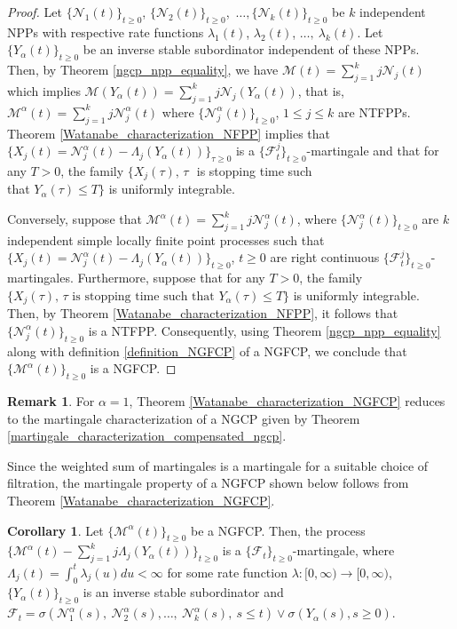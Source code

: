 \documentclass[11pt,oneside,reqno]{amsart}
\theoremstyle{definition}
\newtheorem{remark}{\bf Remark}[section]
\newtheorem{corollary}{Corollary}[section]
\theoremstyle{remarkstyle}
\def\t{\tau}
\begin{document}
\begin{proof}
    Let $\{\mathcal{N}_1(t)\}_{t\ge 0}$, $\{\mathcal{N}_2(t)\}_{t\ge 0}$,~$\dots,\{\mathcal{N}_k(t)\}_{t\ge 0}$ be $k$ independent NPPs with respective rate functions $\lambda_1(t)$, $\lambda_2(t)$, $\dots,~\lambda_k(t)$. Let $\{Y_\alpha(t)\}_{t\ge 0}$ be an inverse stable subordinator independent of these NPPs. Then, by Theorem \ref{ngcp_npp_equality}, we have $\mathcal{M}(t)=\sum_{j=1}^{k}j\mathcal{N}_j(t)$ which implies $\mathcal{M}(Y_\alpha(t))=\sum_{j=1}^{k}j\mathcal{N}_j(Y_\alpha(t))$, that is, $\mathcal{M}^\alpha(t)=\sum_{j=1}^{k}j\mathcal{N}_j^\alpha(t)$ where $\{\mathcal{N}_j^\alpha(t)\}_{t\ge 0}$, $1\le j\le k$ are NTFPPs. Theorem \ref{Watanabe_characterization_NFPP} implies that $\{X_j(t)=\mathcal{N}_j^\alpha(t)-\Lambda_j(Y_\alpha(t))\}_{\t\ge 0}$ is a $\{\mathcal{F}_t^j\}_{t\ge 0}$-martingale and that for any $T>0$, the family $\{X_j(\tau),\,\tau\,\,$ is stopping time such\\ that$\,\,Y_{\alpha}(\tau)\le T\}$ is uniformly integrable. 
    
    Conversely, suppose that $\mathcal{M}^\alpha(t)=\sum_{j=1}^{k}j\mathcal{N}_j^\alpha(t)$, where $\{\mathcal{N}_j^\alpha(t)\}_{t\ge 0}$ are $k$ independent simple locally finite point processes such that $\{X_j(t)=\mathcal{N}_j^\alpha(t)-\Lambda_j(Y_\alpha(t))\}_{t\ge 0}$, $t\ge 0$ are right continuous $\{\mathcal{F}_t^j\}_{t\ge 0}$-martingales. Furthermore, suppose that for any $T>0$, the family $\{X_j(\tau),\,\tau\,\, \text{is stopping time such that}\,\,Y_{\alpha}(\tau)\le T\}$ is uniformly integrable. Then, by Theorem \ref{Watanabe_characterization_NFPP}, it follows that $\{\mathcal{N}_j^\alpha(t)\}_{t\ge 0}$ is a NTFPP. Consequently, using Theorem \ref{ngcp_npp_equality} along with definition \eqref{definition_NGFCP} of a NGFCP, we conclude that $\{\mathcal{M}^\alpha(t)\}_{t\ge 0}$ is a NGFCP.
\end{proof}
\begin{remark}
    For $\alpha=1$, Theorem \ref{Watanabe_characterization_NGFCP} reduces to the martingale characterization of a NGCP given by Theorem \ref{martingale_characterization_compensated_ngcp}.
\end{remark}
Since the weighted sum of martingales is a martingale for a suitable choice of filtration, the martingale property of a NGFCP shown below follows from Theorem \ref{Watanabe_characterization_NGFCP}.
\begin{corollary}\label{martingale_corollary_NGFCP}
    Let $\{\mathcal{M}^\alpha(t)\}_{t\ge 0}$ be a NGFCP. Then, the process $\{\mathcal{M}^\alpha(t)-\sum_{j=1}^{k}j\Lambda_j\left(Y_{\alpha}(t)\right)\}_{t\ge 0}$ is a $\{\mathcal{F}_t\}_{t\ge 0}$-martingale, where $\Lambda_j(t)=\int_{0}^{t}\lambda_j(u)du<\infty$ for some rate function $\lambda:[0,\infty)\to[0,\infty)$, $\{Y_\alpha(t)\}_{t\ge 0}$ is an inverse stable subordinator and $\mathcal{F}_t=\sigma\left(\mathcal{N}_1^\alpha(s),~\mathcal{N}_2^\alpha(s),\dots,~\mathcal{N}_k^\alpha(s),~s\le t\right)\vee\sigma\left(Y_\alpha(s),s\ge 0\right)$.
\end{corollary}
\end{document}
